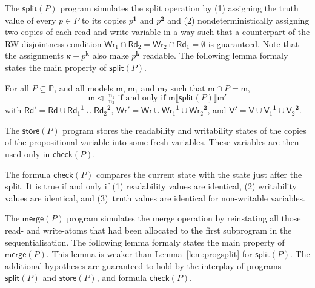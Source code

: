 \documentclass{llncs}
\newcommand{\progStore}{\mathsf{store}}
\newcommand{\progOkChange}{\mathsf{check}}
\newcommand{\progsplit}{\mathsf{split}}
\newcommand{\progmerge}{\mathsf{merge}}
\newcommand{\cp}[2]{{#2}^\mathbf{#1}}
\newcommand{\modl}{\mathsf m}
\newcommand{\splt}[3]{ #1 \triangleleft \, ^{#2}_{#3} }
\newcommand{\readset}{\mathsf{Rd}}
\newcommand{\valuset}{\mathsf{V}}
\newcommand{\writeset}{\mathsf{Wr}}
\newcommand{\assgntopW}[1]{{\mathtt w {+} #1}}
\newcommand{\intPgm}[1]{\llbracket #1 \rrbracket}
\newcommand{\propset}{\mathbb P}
\newcommand{\modinter}{\cap}
\begin{document}
The $\progsplit(P)$ program simulates the split operation by 
(1) assigning the truth value of every $p \in P$ to its copies $\cp 1 p$ and $\cp 2 p$ and
(2) nondeterministically assigning
two copies of each read and write variable in a way such that a counterpart of the RW-disjointness condition
$\writeset_1 \cap \readset_2 = \writeset_2 \cap \readset_1 = \emptyset$ is guaranteed.  
Note that the assignments $\assgntopW{ \cp{k}{p} }$ also make $\cp{k}{p} $ readable.
The following lemma formaly states the main property of $\progsplit(P)$.

\begin{lemma}\label{lem:progsplit}
For all $P \subseteq \propset$, and all models $\modl$, $\modl_1$ and $\modl_2$ such that
$\modl \modinter P = \modl$,
$$ \splt \modl {\modl_1} {\modl_2} \text{ if and only if }
\modl \intPgm{\progsplit(P)} \modl'$$ with
$\readset' = \readset \cup \cp 1 {\readset_1} \cup \cp 2 {\readset_2}$,
$\writeset' = \writeset \cup \cp 1 {\writeset_1} \cup \cp 2 {\writeset_2}$, and
$\valuset' = \valuset \cup \cp 1 {\valuset_1} \cup \cp 2 {\valuset_2}$.
\end{lemma}

The $\progStore(P)$ program stores the readability and writability states of the
copies of the propositional variable into some fresh variables.
These variables are then used only in $\progOkChange(P)$.

The formula $\progOkChange(P)$ compares the current state with the state just after the split.
It is true if and only if
(1) readability values are identical, 
(2) writability values are identical, and
(3)~truth values are identical for non-writable variables.

The $\progmerge(P)$ program simulates the merge operation by reinstating all those 
read- and write-atoms that had been allocated to the first subprogram in the sequentialisation.
The following lemma formaly states the main property of $\progmerge(P)$.
This lemma is weaker than Lemma~\ref{lem:progsplit} for $\progsplit(P)$.
The additional hypotheses are guaranteed to hold by the interplay of programs $\progsplit(P)$ and $\progStore(P)$,
and formula $\progOkChange(P)$.
\end{document}
